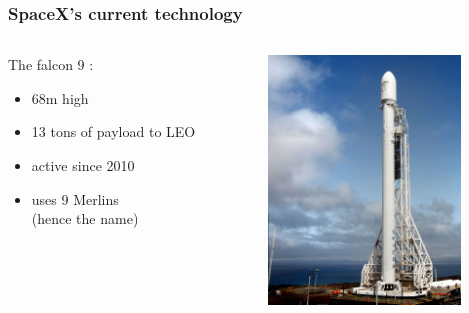 {\begin{frame}
    \frametitle{SpaceX's current technology}
    \begin{columns}
        \begin{column}{60mm}
            The falcon 9 :\\
            \vspace{1em}
            \begin{itemize}
                \item 68m high
                \item 13 tons of payload to LEO
                \item active since 2010
                \item uses 9 Merlins \\(hence the name)
            \end{itemize}
        \end{column}
        \begin{column}{50mm}
\includegraphics[height=66mm]{images/falcon9}
        \end{column}
    \end{columns}
\end{frame}

}
